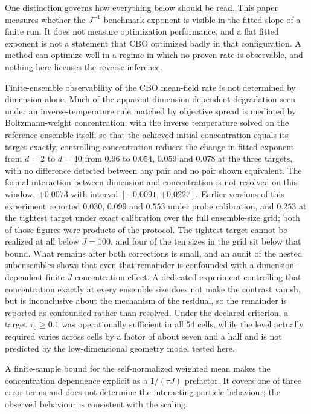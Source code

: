 \documentclass[pdflatex,sn-mathphys-num]{sn-jnl}
\theoremstyle{thmstyleone}
\theoremstyle{thmstyletwo}
\theoremstyle{thmstylethree}
\begin{document}
One distinction governs how everything below should be read. This paper measures whether the $J^{-1}$ benchmark exponent is visible in the fitted slope of a finite run. It does not measure optimization performance, and a flat fitted exponent is not a statement that CBO optimized badly in that configuration. A method can optimize well in a regime in which no proven rate is observable, and nothing here licenses the reverse inference.


Finite-ensemble observability of the CBO mean-field rate is not determined by dimension alone. Much of the apparent dimension-dependent degradation seen under an inverse-temperature rule matched by objective spread is mediated by Boltzmann-weight concentration: with the inverse temperature solved on the reference ensemble itself, so that the achieved initial concentration equals its target exactly, controlling concentration reduces the change in fitted exponent from $d=2$ to $d=40$ from $0.96$ to $0.054$, $0.059$ and $0.078$ at the three targets, with no difference detected between any pair and no pair shown equivalent. The formal interaction between dimension and concentration is not resolved on this window, $+0.0073$ with interval $[-0.0091,+0.0227]$. Earlier versions of this experiment reported $0.030$, $0.099$ and $0.553$ under probe calibration, and $0.253$ at the tightest target under exact calibration over the full ensemble-size grid; both of those figures were products of the protocol. The tightest target cannot be realized at all below $J=100$, and four of the ten sizes in the grid sit below that bound. What remains after both corrections is small, and an audit of the nested subensembles shows that even that remainder is confounded with a dimension-dependent finite-$J$ concentration effect. A dedicated experiment controlling that concentration exactly at every ensemble size does not make the contrast vanish, but is inconclusive about the mechanism of the residual, so the remainder is reported as confounded rather than resolved. Under the declared criterion, a target $\tau_0\ge0.1$ was operationally sufficient in all $54$ cells, while the level actually required varies across cells by a factor of about seven and a half and is not predicted by the low-dimensional geometry model tested here.

A finite-sample bound for the self-normalized weighted mean makes the concentration dependence explicit as a $1/(\tau J)$ prefactor. It covers one of three error terms and does not determine the interacting-particle behaviour; the observed behaviour is consistent with the scaling.
\end{document}
